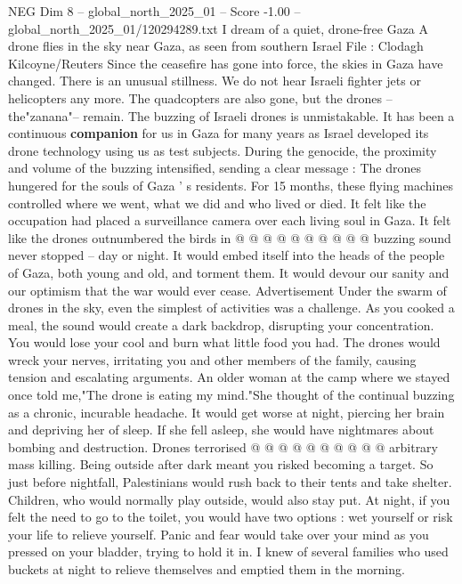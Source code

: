 \begin{textsample}{NEG Dim 8 – global\_north\_2025\_01 – Score -1.00 – global\_north\_2025\_01/120294289.txt}  \label{ex:f8_neg_162}
I dream of a quiet, drone-free Gaza A drone flies in the sky near Gaza, as seen from southern Israel File : Clodagh Kilcoyne/Reuters Since the ceasefire has gone into force, the skies in Gaza have changed.
There is an unusual stillness.
We do not hear Israeli fighter jets or helicopters any more.
The quadcopters are also gone, but the drones -- the"zanana"-- remain.
The buzzing of Israeli drones is unmistakable.
It has been a continuous \textbf{companion} for us in Gaza for many years as Israel developed its drone technology using us as test subjects.
During the genocide, the proximity and volume of the buzzing intensified, sending a clear message : The drones hungered for the souls of Gaza ' s residents.
For 15 months, these flying machines controlled where we went, what we did and who lived or died.
It felt like the occupation had placed a surveillance camera over each living soul in Gaza.
It felt like the drones outnumbered the birds in @ @ @ @ @ @ @ @ @ @ buzzing sound never stopped -- day or night.
It would embed itself into the heads of the people of Gaza, both young and old, and torment them.
It would devour our sanity and our optimism that the war would ever cease.
Advertisement Under the swarm of drones in the sky, even the simplest of activities was a challenge.
As you cooked a meal, the sound would create a dark backdrop, disrupting your concentration.
You would lose your cool and burn what little food you had.
The drones would wreck your nerves, irritating you and other members of the family, causing tension and escalating arguments.
An older woman at the camp where we stayed once told me,"The drone is eating my mind."She thought of the continual buzzing as a chronic, incurable headache.
It would get worse at night, piercing her brain and depriving her of sleep.
If she fell asleep, she would have nightmares about bombing and destruction.
Drones terrorised @ @ @ @ @ @ @ @ @ @ arbitrary mass killing.
Being outside after dark meant you risked becoming a target.
So just before nightfall, Palestinians would rush back to their tents and take shelter.
Children, who would normally play outside, would also stay put.
At night, if you felt the need to go to the toilet, you would have two options : wet yourself or risk your life to relieve yourself.
Panic and fear would take over your mind as you pressed on your bladder, trying to hold it in.
I knew of several families who used buckets at night to relieve themselves and emptied them in the morning.

\end{textsample}
